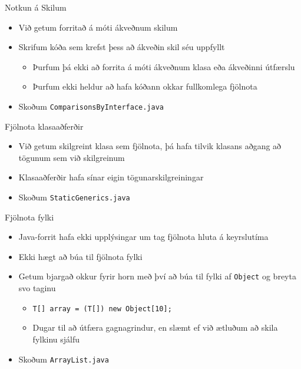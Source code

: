 \documentclass{beamer}
\begin{document}
\begin{frame}{Notkun á Skilum}
	\begin{itemize}
		\item Við getum forritað á móti ákveðnum skilum 
		\item Skrifum kóða sem krefst þess að ákveðin skil séu uppfyllt
		      \begin{itemize}
			      \item Þurfum þá ekki að forrita á móti ákveðnum klasa eða ákveðinni útfærslu
			      \item Þurfum ekki heldur að hafa kóðann okkar fullkomlega fjölnota 
		      \end{itemize}
		\item Skoðum \texttt{ComparisonsByInterface.java}
	\end{itemize}
\end{frame}

\begin{frame}{Fjölnota klasaaðferðir}
	\begin{itemize}
		\item Við getum skilgreint klasa sem fjölnota, þá hafa tilvik klasans aðgang að tögunum sem við skilgreinum
		\item Klasaaðferðir hafa sínar eigin tögunarskilgreiningar
		\item Skoðum \texttt{StaticGenerics.java}
	\end{itemize}
\end{frame}

\begin{frame}{Fjölnota fylki}
	\begin{itemize}
		\item Java-forrit hafa ekki upplýsingar um tag fjölnota hluta á keyrslutíma 
		\item Ekki hægt að búa til fjölnota fylki
		\item Getum bjargað okkur fyrir horn með því að búa til fylki af \texttt{Object} og breyta svo taginu
		      \begin{itemize}
			      \item \texttt{T[] array = (T[]) new Object[10];}
			      \item Dugar til að útfæra gagnagrindur, en slæmt ef við ætluðum að skila fylkinu sjálfu
		      \end{itemize}
		\item Skoðum \texttt{ArrayList.java}
	\end{itemize}
\end{frame}
\end{document}
